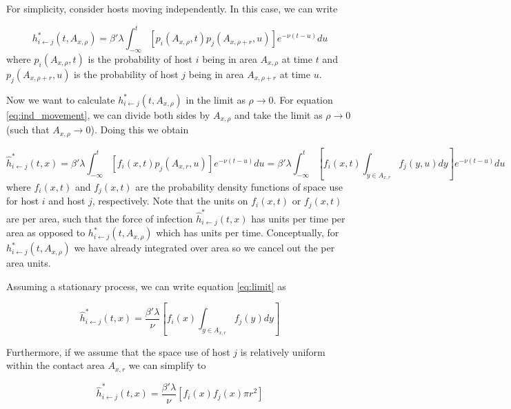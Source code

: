 \documentclass[11pt]{article}
\begin{document}
For simplicity, consider hosts moving independently. In this case, we can write

\begin{equation}
    h^*_{i \leftarrow j}(t, A_{x, \rho}) = \beta' \lambda \int_{-\infty}^{t} [p_i(A_{x, \rho}, t) p_j(A_{x, \rho + r}, u)] e^{-\nu(t - u)} du
    \label{eq:ind_movement}
\end{equation}
where $p_i(A_{x, \rho}, t)$ is the probability of host $i$ being in area $A_{x, \rho}$ at time $t$ and $p_j(A_{x, \rho + r}, u)$ is the probability of host $j$ being in area $A_{x, \rho + r}$ at time $u$.

Now we want to calculate $h^*_{i \leftarrow j}(t, A_{x, \rho})$ in the limit as $\rho \rightarrow 0$. For equation \ref{eq:ind_movement}, we can divide both sides by $A_{x, \rho}$ and take the limit as $\rho \rightarrow 0$ (such that $A_{x, \rho} \rightarrow 0$). Doing this we obtain

\begin{equation}
    \hat{h}^*_{i \leftarrow j}(t, x) = \beta' \lambda \int_{-\infty}^{t} [f_i(x, t) p_j(A_{x, r}, u)] e^{-\nu(t - u)} du = \beta' \lambda \int_{-\infty}^{t} [f_i(x, t) \int_{y \in A_{x, r}} f_j(y, u) dy] e^{-\nu(t - u)} du
    \label{eq:limit}
\end{equation}
where $f_i(x, t)$ and $f_j(x, t)$ are the probability density functions of space use for host $i$ and host $j$, respectively.  Note that the units on $f_i(x, t)$ or $f_j(x, t)$ are per area, such that the force of infection $\hat{h}^*_{i \leftarrow j}(t, x)$ has units per time per area as opposed to $h^*_{i \leftarrow j}(t, A_{x, \rho})$ which has units per time. Conceptually, for $h^*_{i \leftarrow j}(t, A_{x, \rho})$ we have already integrated over area so we cancel out the per area units.  

Assuming a stationary process, we can write equation \ref{eq:limit} as

\begin{equation}
    \hat{h}^*_{i \leftarrow j}(t, x) =  \frac{\beta' \lambda}{\nu} [f_i(x) \int_{y \in A_{x, r}} f_j(y) dy]
\end{equation}

Furthermore, if we assume that the space use of host $j$ is relatively uniform within the contact area $A_{x, r}$ we can simplify to

\begin{equation}
    \hat{h}^*_{i \leftarrow j}(t, x) =  \frac{\beta' \lambda}{\nu} [f_i(x) f_j(x) \pi r^2]
\end{equation}
\end{document}
